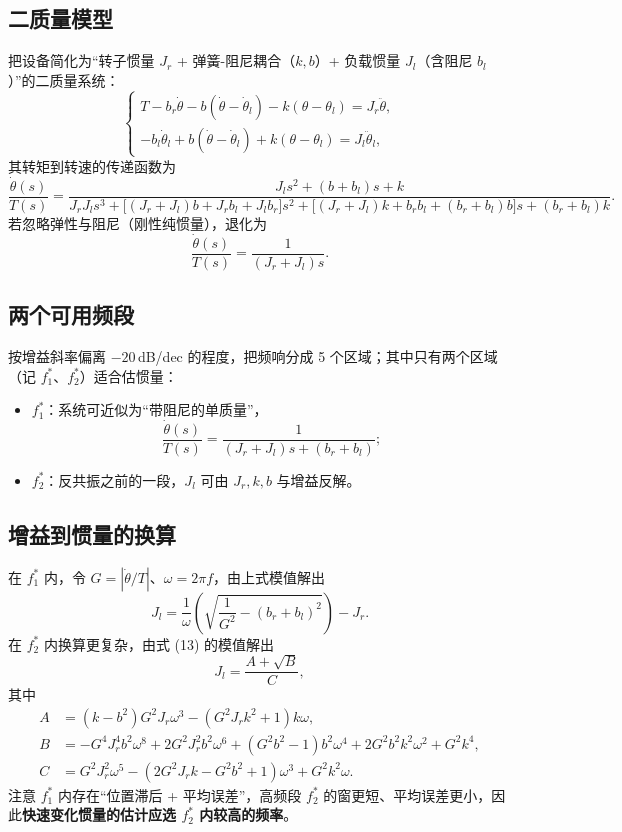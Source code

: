 \documentclass[UTF8,a4paper,11pt]{ctexart}
\begin{document}
\subsection{二质量模型}
把设备简化为“转子惯量 $J_r$ + 弹簧-阻尼耦合（$k,b$）+ 负载惯量 $J_l$（含阻尼 $b_l$）”的二质量系统：
\begin{equation}
\begin{cases}
T-b_r\dot\theta-b(\dot\theta-\dot\theta_l)-k(\theta-\theta_l)=J_r\ddot\theta,\\
-b_l\dot\theta_l+b(\dot\theta-\dot\theta_l)+k(\theta-\theta_l)=J_l\ddot\theta_l,
\end{cases}
\end{equation}
其转矩到转速的传递函数为
\begin{equation}
\frac{\dot\theta(s)}{T(s)}=\frac{J_l s^2+(b+b_l)s+k}{J_rJ_l s^3+\big[(J_r+J_l)b+J_rb_l+J_lb_r\big]s^2+\big[(J_r+J_l)k+b_rb_l+(b_r+b_l)b\big]s+(b_r+b_l)k}.
\end{equation}
若忽略弹性与阻尼（刚性纯惯量），退化为
\begin{equation}
\frac{\dot\theta(s)}{T(s)}=\frac{1}{(J_r+J_l)s}.
\end{equation}

\subsection{两个可用频段}
按增益斜率偏离 $-20$\,dB/dec 的程度，把频响分成 5 个区域；其中只有两个区域（记 $f_1^*$、$f_2^*$）适合估惯量：
\begin{itemize}
  \item $f_1^*$：系统可近似为“带阻尼的单质量”，
  \begin{equation}
  \frac{\dot\theta(s)}{T(s)}=\frac{1}{(J_r+J_l)s+(b_r+b_l)};
  \end{equation}
  \item $f_2^*$：反共振之前的一段，$J_l$ 可由 $J_r,k,b$ 与增益反解。
\end{itemize}

\subsection{增益到惯量的换算}
在 $f_1^*$ 内，令 $G=|\dot\theta/T|$、$\omega=2\pi f$，由上式模值解出
\begin{equation}
J_l=\frac{1}{\omega}\left(\sqrt{\frac{1}{G^2}-(b_r+b_l)^2}\right)-J_r .
\label{eq:conv1}
\end{equation}
在 $f_2^*$ 内换算更复杂，由式 (13) 的模值解出
\begin{equation}
J_l=\frac{A+\sqrt{B}}{C},
\end{equation}
其中
\begin{equation}
\begin{aligned}
A&=(k-b^2)G^2J_r\omega^3-(G^2J_rk^2+1)k\omega,\\
B&=-G^4J_r^4b^2\omega^8+2G^2J_r^2b^2\omega^6+(G^2b^2-1)b^2\omega^4+2G^2b^2k^2\omega^2+G^2k^4,\\
C&=G^2J_r^2\omega^5-(2G^2J_rk-G^2b^2+1)\omega^3+G^2k^2\omega .
\end{aligned}
\end{equation}
注意 $f_1^*$ 内存在“位置滞后 + 平均误差”，高频段 $f_2^*$ 的窗更短、平均误差更小，因此\textbf{快速变化惯量的估计应选 $f_2^*$ 内较高的频率}。
\end{document}
